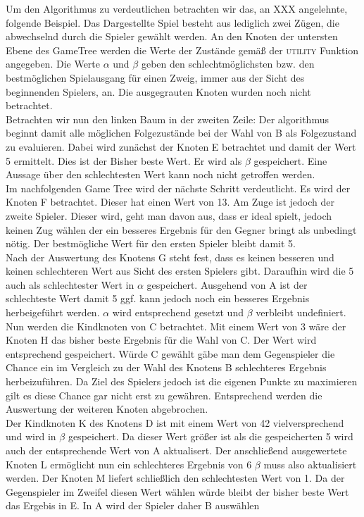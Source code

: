 Um den Algorithmus zu verdeutlichen betrachten wir das, an  XXX angelehnte, folgende Beispiel. Das Dargestellte Spiel besteht aus lediglich zwei Zügen, die abwechselnd durch die Spieler gewählt werden. An den Knoten der untersten Ebene des GameTree werden die Werte der Zustände gemäß der \textsc{utility} Funktion angegeben. Die Werte $\alpha$ und $\beta$ geben den schlechtmöglichsten bzw. den bestmöglichen Spielausgang für einen Zweig, immer aus der Sicht des beginnenden Spielers, an. Die ausgegrauten Knoten wurden noch nicht betrachtet.\\
Betrachten wir nun den linken Baum in der zweiten Zeile: Der algorithmus beginnt damit alle möglichen Folgezustände bei der Wahl von B als Folgezustand zu evaluieren. Dabei wird zunächst der Knoten E betrachtet und damit der Wert 5 ermittelt. Dies ist der Bisher beste Wert. Er wird als $\beta$ gespeichert. Eine Aussage über den schlechtesten Wert kann noch nicht getroffen werden.\\
Im nachfolgenden Game Tree wird der nächste Schritt verdeutlicht. Es wird der Knoten F betrachtet. Dieser hat einen Wert von 13. Am Zuge ist jedoch der zweite Spieler. Dieser wird, geht man davon aus, dass er ideal spielt, jedoch keinen Zug wählen der ein besseres Ergebnis für den Gegner bringt als unbedingt nötig. Der bestmögliche Wert für den ersten Spieler bleibt damit 5.\\
Nach der Auswertung des Knotens G steht fest, dass es keinen besseren und keinen schlechteren Wert aus Sicht des ersten Spielers gibt. Daraufhin wird die 5 auch als schlechtester Wert in $\alpha$ gespeichert. Ausgehend von A  ist der schlechteste Wert damit 5 ggf. kann jedoch noch ein besseres Ergebnis herbeigeführt werden. $\alpha$ wird entsprechend gesetzt und $\beta$ verbleibt undefiniert.\\
Nun werden die Kindknoten von C betrachtet. Mit einem Wert von 3 wäre der Knoten H das bisher beste Ergebnis für die Wahl von C. Der Wert wird entsprechend gespeichert. Würde C gewählt gäbe man dem Gegenspieler die Chance ein im Vergleich zu der Wahl des Knotens B schlechteres Ergebnis herbeizuführen. Da Ziel des Spielers jedoch ist die eigenen Punkte zu maximieren gilt es diese Chance gar nicht erst zu gewähren. Entsprechend werden die Auswertung der weiteren Knoten abgebrochen.\\
Der Kindknoten K des Knotens D ist mit einem Wert von 42 vielversprechend und wird in $\beta$ gespeichert. Da dieser Wert größer ist als die gespeicherten 5 wird auch der entsprechende Wert von A aktualisert. Der anschließend ausgewertete Knoten L ermöglicht nun ein schlechteres Ergebnis von 6 $\beta$ muss also aktualisiert werden. Der Knoten M liefert schließlich den schlechtesten Wert von 1. Da der Gegenspieler im Zweifel diesen Wert wählen würde bleibt der bisher beste Wert das Ergebis in E. In A wird der Spieler daher B auswählen

